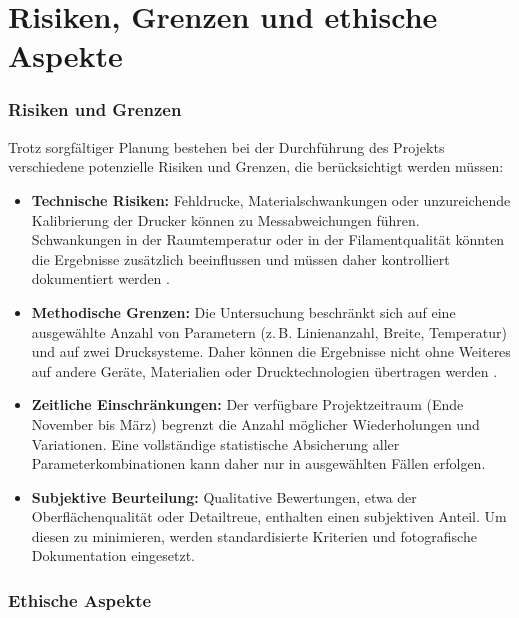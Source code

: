 \chapter{Risiken, Grenzen und ethische Aspekte}
\label{cha:Risiken, Grenzen und ethische Aspekte}

\subsection{Risiken und Grenzen}

Trotz sorgfältiger Planung bestehen bei der Durchführung des Projekts verschiedene potenzielle Risiken und Grenzen, die berücksichtigt werden müssen:

\begin{itemize}
  \item \textbf{Technische Risiken:} 
  Fehldrucke, Materialschwankungen oder unzureichende Kalibrierung der Drucker können zu Messabweichungen führen.  
  Schwankungen in der Raumtemperatur oder in der Filamentqualität könnten die Ergebnisse zusätzlich beeinflussen und müssen daher kontrolliert dokumentiert werden \cite{Kristiawan2021}.
  
  \item \textbf{Methodische Grenzen:} 
  Die Untersuchung beschränkt sich auf eine ausgewählte Anzahl von Parametern (z.\,B. Linienanzahl, Breite, Temperatur) und auf zwei Drucksysteme.  
  Daher können die Ergebnisse nicht ohne Weiteres auf andere Geräte, Materialien oder Drucktechnologien übertragen werden \cite{FFFPolymerReview}.
  
  \item \textbf{Zeitliche Einschränkungen:} 
  Der verfügbare Projektzeitraum (Ende November bis März) begrenzt die Anzahl möglicher Wiederholungen und Variationen.  
  Eine vollständige statistische Absicherung aller Parameterkombinationen kann daher nur in ausgewählten Fällen erfolgen.
  
  \item \textbf{Subjektive Beurteilung:} 
  Qualitative Bewertungen, etwa der Oberflächenqualität oder Detailtreue, enthalten einen subjektiven Anteil.  
  Um diesen zu minimieren, werden standardisierte Kriterien und fotografische Dokumentation eingesetzt.
\end{itemize}

\subsection{Ethische Aspekte}

